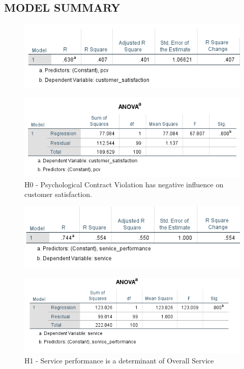 \documentclass[a4paper, 14pt]{article}
\begin{document}
{\subsection*{MODEL SUMMARY}
\begin{figure}[H]
\centering
\includegraphics[scale=1]{pcv_vs_customer_satisfaction.png}
\end{figure}

\begin{figure}[H]
\centering
\includegraphics[scale=1]{anova_pcv_cs.png}
\caption{H0 - Psychological Contract Violation has negative influence on customer satisfaction.}
\end{figure}


\begin{figure}[H]
\centering
\includegraphics[scale=1]{service_performance_vs_service.png}
\end{figure}

\begin{figure}[H]
\centering
\includegraphics[scale=1]{anova_s_sp.png}
\caption{H1 - Service performance is a determinant of Overall Service}
\end{figure}


}
\end{document}
